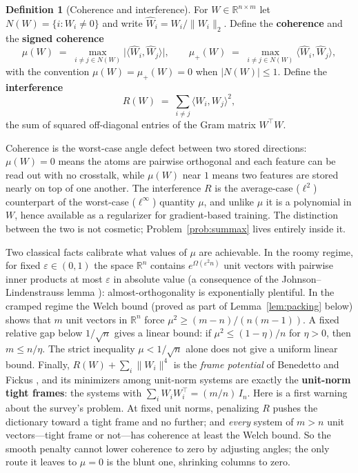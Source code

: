 \documentclass[11pt]{amsart}
\theoremstyle{plain}
\theoremstyle{definition}
\newtheorem{definition}[theorem]{Definition}
\newcommand{\R}{\mathbb{R}}
\begin{document}
\begin{definition}[Coherence and interference]\label{def:coherence}
For $W\in\R^{n\times m}$ let $N(W)=\{i: W_i\neq 0\}$ and write $\widehat W_i = W_i/\|W_i\|_2$. Define the \textbf{coherence} and the \textbf{signed coherence}
\[
\mu(W) \;=\; \max_{i\neq j\in N(W)} \bigl|\langle \widehat W_i,\widehat W_j\rangle\bigr|,
\qquad
\mu_+(W) \;=\; \max_{i\neq j\in N(W)} \langle \widehat W_i,\widehat W_j\rangle ,
\]
with the convention $\mu(W)=\mu_+(W)=0$ when $|N(W)|\le 1$. Define the \textbf{interference}
\[
R(W) \;=\; \sum_{i\neq j} \langle W_i,W_j\rangle^2 ,
\]
the sum of squared off-diagonal entries of the Gram matrix $W^{\top}W$.
\end{definition}

Coherence is the worst-case angle defect between two stored directions: $\mu(W)=0$ means the atoms are pairwise orthogonal and each feature can be read out with no crosstalk, while $\mu(W)$ near $1$ means two features are stored nearly on top of one another. The interference $R$ is the average-case ($\ell^2$) counterpart of the worst-case ($\ell^\infty$) quantity $\mu$, and unlike $\mu$ it is a polynomial in $W$, hence available as a regularizer for gradient-based training. The distinction between the two is not cosmetic; Problem~\ref{prob:summax} lives entirely inside it.

Two classical facts calibrate what values of $\mu$ are achievable. In the roomy regime, for fixed $\varepsilon\in(0,1)$ the space $\R^n$ contains $e^{\Omega(\varepsilon^2 n)}$ unit vectors with pairwise inner products at most $\varepsilon$ in absolute value (a consequence of the Johnson--Lindenstrauss lemma \cite{johnson1984}): almost-orthogonality is exponentially plentiful. In the cramped regime the Welch bound \cite{welch1974} (proved as part of Lemma~\ref{lem:packing} below) shows that $m$ unit vectors in $\R^n$ force $\mu^2 \ge (m-n)/(n(m-1))$. A fixed relative gap below $1/\sqrt n$ gives a linear bound: if $\mu^2\le(1-\eta)/n$ for $\eta>0$, then $m\le n/\eta$. The strict inequality $\mu<1/\sqrt n$ alone does not give a uniform linear bound. Finally, $R(W)+\sum_i \|W_i\|^4$ is the \emph{frame potential} of Benedetto and Fickus \cite{benedetto2003}, and its minimizers among unit-norm systems are exactly the \textbf{unit-norm tight frames}: the systems with $\sum_i W_iW_i^{\top}=(m/n)\,I_n$. Here is a first warning about the survey's problem. At fixed unit norms, penalizing $R$ pushes the dictionary toward a tight frame and no further; and \emph{every} system of $m>n$ unit vectors---tight frame or not---has coherence at least the Welch bound. So the smooth penalty cannot lower coherence to zero by adjusting angles; the only route it leaves to $\mu=0$ is the blunt one, shrinking columns to zero.
\end{document}
